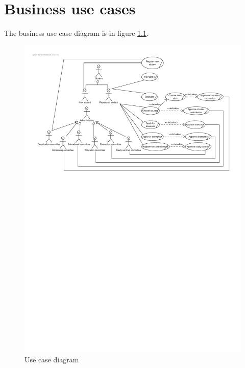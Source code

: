 \chapter{Business use cases}
\label{business-uc}

\npar The business use case diagram is in figure \ref{fig:business-use-case-diagram}.

\begin{figure}[H]
	\begin{centering}
		\includegraphics[width=\textwidth]{figs/business-use-case-diagram.pdf}
		\caption{Use case diagram}
		\label{fig:business-use-case-diagram}
	\end{centering}
\end{figure}













